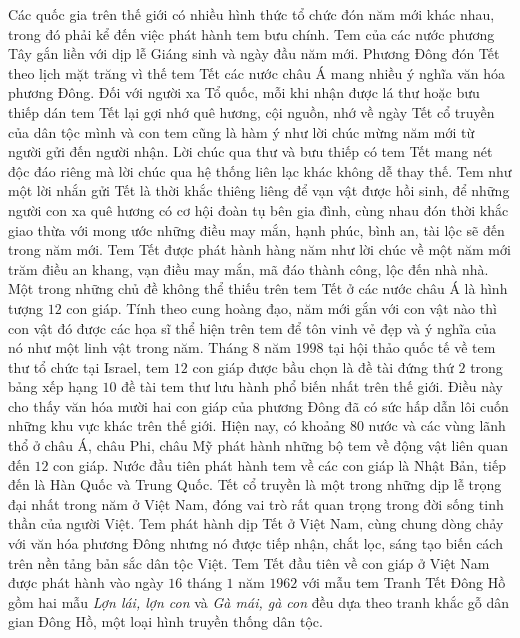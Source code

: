 \centering
\endgroup
\vspace*{66pt}
\begin{multicols}{2}
	Các quốc gia trên thế giới có nhiều hình thức tổ chức đón năm mới khác nhau, trong đó phải kể đến việc phát hành tem bưu chính. Tem của các nước phương Tây gắn liền với dịp lễ Giáng sinh và ngày đầu năm mới. Phương Đông đón Tết theo lịch mặt trăng vì thế tem Tết các nước châu Á mang nhiều ý nghĩa văn hóa phương Đông. Đối với người xa Tổ quốc, mỗi khi nhận được lá thư hoặc bưu thiếp dán tem Tết lại gợi nhớ quê hương, cội nguồn, nhớ về ngày Tết cổ truyền của dân tộc mình và con tem cũng là hàm ý như lời chúc mừng năm mới từ người gửi đến người nhận. Lời chúc qua thư và bưu thiếp có tem Tết mang nét độc đáo riêng mà lời chúc qua hệ thống liên lạc khác không dễ thay thế. Tem như một lời nhắn gửi Tết là thời khắc thiêng liêng để vạn vật được hồi sinh, để những người con xa quê hương có cơ hội đoàn tụ bên gia đình, cùng nhau đón thời khắc giao thừa với mong ước những điều may mắn, hạnh phúc, bình an, tài lộc sẽ đến trong năm mới. Tem Tết được phát hành hàng năm như lời chúc về một năm mới trăm điều an khang, vạn điều may mắn, mã đáo thành công, lộc đến nhà nhà.
	\vskip 0.1cm 
	Một trong những chủ đề không thể thiếu trên tem Tết ở các nước châu Á là hình tượng $12$ con giáp. Tính theo cung hoàng đạo, năm mới gắn với con vật nào thì con vật đó được các họa sĩ thể hiện trên tem để tôn vinh vẻ đẹp và ý nghĩa của nó như một linh vật trong năm. Tháng $8$ năm $1998$ tại hội thảo quốc tế về tem thư tổ chức tại Israel, tem $12$ con giáp được bầu chọn là đề tài đứng thứ $2$ trong bảng xếp hạng $10$ đề tài tem thư lưu hành phổ biến nhất trên thế giới. Điều này cho thấy văn hóa mười hai con giáp của phương Đông đã có sức hấp dẫn lôi cuốn những khu vực khác trên thế giới.
	\vskip 0.1cm 
	Hiện nay, có khoảng $80$ nước và các vùng lãnh thổ ở châu Á, châu Phi, châu Mỹ phát hành những bộ tem về động vật liên quan đến $12$ con giáp. Nước đầu tiên phát hành tem về các con giáp là Nhật Bản, tiếp đến là Hàn Quốc và Trung Quốc. Tết cổ truyền là một trong những dịp lễ trọng đại nhất trong năm ở Việt Nam, đóng vai trò rất quan trọng trong đời sống tinh thần của người Việt. Tem phát hành dịp Tết ở Việt Nam, cùng chung dòng chảy với văn hóa phương Đông nhưng nó được tiếp nhận, chắt lọc, sáng tạo biến cách trên nền tảng bản sắc dân tộc Việt. Tem Tết đầu tiên về con giáp ở Việt Nam được phát hành vào ngày $16$ tháng $1$ năm $1962$ với mẫu tem Tranh Tết Đông Hồ gồm hai mẫu \textit{Lợn lái, lợn con} và \textit{Gà mái, gà con} đều dựa theo tranh khắc gỗ dân gian Đông Hồ, một loại hình truyền thống dân tộc. 

\end{multicols}
